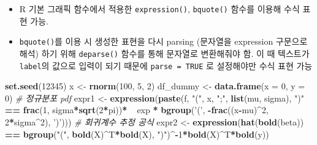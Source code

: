 \documentclass[
  11pt,
]{krantz}
\newenvironment{Shaded}{\begin{snugshade}}{\end{snugshade}}
\newcommand{\CommentTok}[1]{\textcolor[rgb]{0.37,0.37,0.37}{\textit{#1}}}
\newcommand{\DataTypeTok}[1]{\textcolor[rgb]{0.27,0.27,0.27}{#1}}
\newcommand{\DecValTok}[1]{\textcolor[rgb]{0.06,0.06,0.06}{#1}}
\newcommand{\ErrorTok}[1]{\textcolor[rgb]{0.14,0.14,0.14}{\textbf{#1}}}
\newcommand{\KeywordTok}[1]{\textcolor[rgb]{0.27,0.27,0.27}{\textbf{#1}}}
\newcommand{\NormalTok}[1]{#1}
\newcommand{\OperatorTok}[1]{\textcolor[rgb]{0.43,0.43,0.43}{\textbf{#1}}}
\newcommand{\StringTok}[1]{\textcolor[rgb]{0.5,0.5,0.5}{#1}}
\providecommand{\tightlist}{%
  \setlength{\itemsep}{0pt}\setlength{\parskip}{0pt}}
\begin{document}
\begin{itemize}
\tightlist
\item
  R 기본 그래픽 함수에서 적용한 \texttt{expression()}, \texttt{bquote()} 함수를 이용해 수식 표현 가능.
\item
  \texttt{bquote()}를 이용 시 생성한 표현을 다시 parsing (문자열을 expression 구문으로 해석) 하기 위해 \texttt{deparse()} 함수를 통해 문자열로 변환해줘야 함. 이 때 텍스트가 \texttt{label}의 값으로 입력이 되기 때문에 \texttt{parse\ =\ TRUE} 로 설정해야만 수식 표현 가능
\end{itemize}

\footnotesize

\begin{Shaded}
\begin{Highlighting}[]
\KeywordTok{set.seed}\NormalTok{(}\DecValTok{12345}\NormalTok{)}
\NormalTok{x <-}\StringTok{ }\KeywordTok{rnorm}\NormalTok{(}\DecValTok{100}\NormalTok{, }\DecValTok{5}\NormalTok{, }\DecValTok{2}\NormalTok{)}
\NormalTok{df_dummy <-}\StringTok{ }\KeywordTok{data.frame}\NormalTok{(}\DataTypeTok{x =} \DecValTok{0}\NormalTok{, }\DataTypeTok{y =} \DecValTok{0}\NormalTok{)}
\CommentTok{# 정규분포 pdf }
\NormalTok{expr1 <-}\StringTok{ }\KeywordTok{expression}\NormalTok{(}\KeywordTok{paste}\NormalTok{(f, }
                          \StringTok{"("}\NormalTok{, x, }\StringTok{";"}\NormalTok{, }\KeywordTok{list}\NormalTok{(mu, sigma), }\StringTok{")"}
                          \OperatorTok{==}\StringTok{ }\KeywordTok{frac}\NormalTok{(}\DecValTok{1}\NormalTok{, sigma}\OperatorTok{*}\KeywordTok{sqrt}\NormalTok{(}\DecValTok{2}\OperatorTok{*}\NormalTok{pi))}\OperatorTok{*}\ErrorTok{~~}\NormalTok{exp }\OperatorTok{*}
\StringTok{                            }\KeywordTok{bgroup}\NormalTok{(}\StringTok{'('}\NormalTok{, }
                                   \OperatorTok{-}\KeywordTok{frac}\NormalTok{((x}\OperatorTok{-}\NormalTok{mu)}\OperatorTok{^}\DecValTok{2}\NormalTok{, }
                                         \DecValTok{2}\OperatorTok{*}\NormalTok{sigma}\OperatorTok{^}\DecValTok{2}\NormalTok{), }\StringTok{')'}\NormalTok{)))}
\CommentTok{# 회귀계수 추정 공식}
\NormalTok{expr2 <-}\StringTok{ }\KeywordTok{expression}\NormalTok{(}\KeywordTok{hat}\NormalTok{(}\KeywordTok{bold}\NormalTok{(beta)) }\OperatorTok{==}
\StringTok{                    }\KeywordTok{bgroup}\NormalTok{(}\StringTok{"("}\NormalTok{, }\KeywordTok{bold}\NormalTok{(X)}\OperatorTok{^}\NormalTok{T}\OperatorTok{*}\KeywordTok{bold}\NormalTok{(X), }
                     \StringTok{")"}\NormalTok{)}\OperatorTok{^-}\DecValTok{1}\OperatorTok{*}\KeywordTok{bold}\NormalTok{(X)}\OperatorTok{^}\NormalTok{T}\OperatorTok{*}\KeywordTok{bold}\NormalTok{(y))}

\end{Highlighting}
\end{Shaded}
\end{document}
